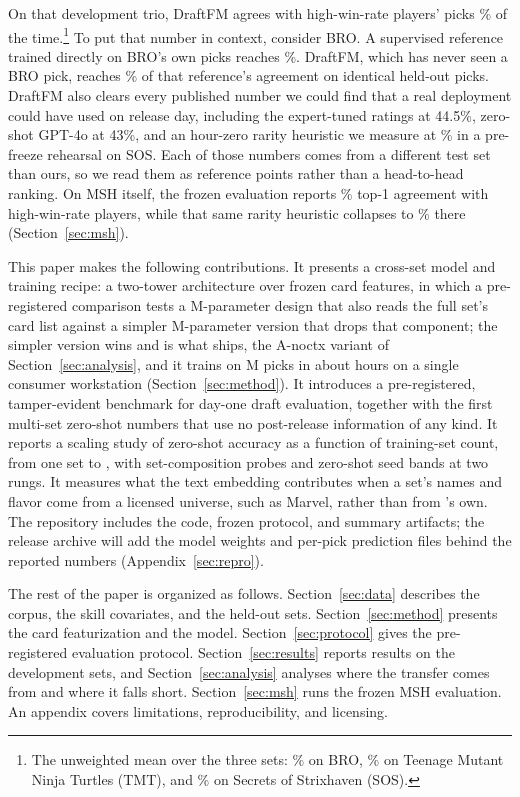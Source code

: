 On that development trio, DraftFM agrees with high-win-rate players' picks
\FdevDevMean\% of the time.\footnote{The unweighted mean over the three
sets: \FdevBro\% on BRO, \FdevTmt\% on Teenage Mutant Ninja Turtles (TMT),
and \FdevSos\% on Secrets of Strixhaven (SOS).} To put that number in
context, consider BRO. A supervised reference trained directly on BRO's
own picks reaches \CeilBro\%. DraftFM, which has never seen a BRO pick,
reaches \NormScoreBro\% of that reference's agreement on identical
held-out picks. DraftFM also clears every published
number we could find that a real deployment could have used on release
day, including the expert-tuned ratings at 44.5\%, zero-shot GPT-4o at
43\%, and an hour-zero rarity heuristic we measure at \BaseRarity\% in a
pre-freeze rehearsal on SOS. Each of those numbers comes from a different
test set than ours, so we read them as reference points rather than a
head-to-head ranking. On MSH itself, the frozen evaluation reports
\FfullMsh\% top-1 agreement with high-win-rate players, while that same
rarity heuristic collapses to \BaseRarityMsh\% there
(Section~\ref{sec:msh}).

This paper makes the following contributions. It presents a cross-set
model and training recipe: a two-tower architecture over frozen card
features, in which a pre-registered comparison tests a
\FdevParams M-parameter design that also reads the full set's card list
against a simpler \FfullParams M-parameter version that drops that
component; the simpler version wins and is what ships, the A-noctx variant
of Section~\ref{sec:analysis}, and it trains on \FdevPicks M picks in
about \FdevWallHours{} hours on a single consumer workstation
(Section~\ref{sec:method}). It introduces a pre-registered, tamper-evident
benchmark for day-one draft evaluation, together with the first multi-set
zero-shot numbers that use no post-release information of any kind. It
reports a scaling study of zero-shot accuracy as a function of
training-set count, from one set to \FdevSets{}, with set-composition
probes and zero-shot seed bands at two rungs. It measures what the text
embedding contributes when a set's names and flavor come from a licensed
universe, such as Marvel, rather than from \mtg{}'s own. The repository
includes the code, frozen protocol, and summary artifacts; the release
archive will add the model weights and per-pick prediction files behind
the reported numbers (Appendix~\ref{sec:repro}).

The rest of the paper is organized as follows. Section~\ref{sec:data}
describes the corpus, the skill covariates, and the held-out sets.
Section~\ref{sec:method} presents the card featurization and the model.
Section~\ref{sec:protocol} gives the pre-registered evaluation protocol.
Section~\ref{sec:results} reports results on the development sets, and
Section~\ref{sec:analysis} analyses where the transfer comes from and
where it falls short. Section~\ref{sec:msh} runs the frozen MSH
evaluation. An appendix covers limitations, reproducibility, and
licensing.

